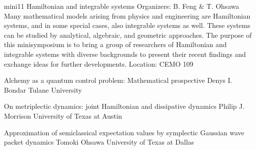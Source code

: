 \mini
{mini11}
{Hamiltonian and integrable systems}
{Organizers: B. Feng \& T. Ohsawa}
{Many mathematical models arising from physics and engineering are Hamiltonian systems, and in some special cases, also integrable systems as well. These systems can be studied by analytical, algebraic, and geometric approaches. The purpose of this minisymposium is to bring a group of researchers of Hamiltonian and integrable systems with diverse backgrounds to present their recent findings and exchange ideas for further developments.}
{Location: CEMO 109}

\begin{talks}
\item\talk
{Alchemy as a quantum control problem: Mathematical prospective}
{Denys I. Bondar}
{Tulane University}
\item\talk
{On metriplectic dynamics:  joint Hamiltonian and dissipative dynamics}
{Philip J. Morrison}
{University of Texas at Austin}
\item\talk
{Approximation of semiclassical expectation values by symplectic Gaussian wave packet dynamics}
{Tomoki Ohsawa}
{University of Texas at Dallas}
\end{talks}
\room
